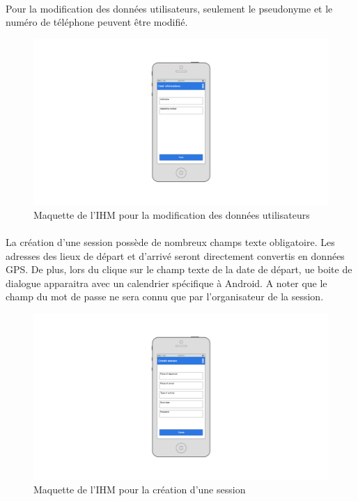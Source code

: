 \documentclass[titlepage, 12pt]{report}
\begin{document}
\clearpage

\paragraph{}Pour la modification des données utilisateurs, seulement le pseudonyme et le numéro de téléphone peuvent être modifié.

\begin{figure}[!h]
	\caption{Maquette de l'IHM pour la modification des données utilisateurs}
	\label{modify_user_account}
	\centering
	\includegraphics[scale=0.3]{images/mockups/modify_user_profile.png}
\end{figure}

\clearpage

\paragraph{}La création d'une session possède de nombreux champs texte obligatoire. Les adresses des lieux de départ et d'arrivé seront directement convertis en données GPS. De plus, lors du clique sur le champ texte de la date de départ, ue boite de dialogue apparaitra avec un calendrier spécifique à Android. A noter que le champ du mot de passe ne sera connu que par l'organisateur de la session.

\begin{figure}[!h]
	\caption{Maquette de l'IHM pour la création d'une session}
	\label{create_session}
	\centering
	\includegraphics[scale=0.3]{images/mockups/create_session.png}
\end{figure}
\end{document}
